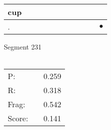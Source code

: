 \documentclass[landscape]{article}
\newcommand{\ssp}{\hspace{2pt}}
\newcommand{\mex}{\cellcolor{g}$\bullet$}
\begin{document}
\begin{tabular}{|l|p{10pt}|p{10pt}|p{10pt}|p{10pt}|p{10pt}|p{10pt}|p{10pt}|p{10pt}|p{10pt}|p{10pt}|}
\hline
\ssp cup \ssp&\hspace{2pt}&\hspace{2pt}&\hspace{2pt}&\hspace{2pt}&\hspace{2pt}&\hspace{2pt}&\hspace{2pt}&\hspace{2pt}&\hspace{2pt}&\hspace{2pt}\\
\hline
\ssp \cellcolor{ref9}. \ssp&\hspace{2pt}&\hspace{2pt}&\hspace{2pt}&\hspace{2pt}&\hspace{2pt}&\hspace{2pt}&\hspace{2pt}&\hspace{2pt}&\hspace{2pt}&\hspace{2pt}\mex\\
\hline
\end{tabular}

\vspace{6pt}
\noindent Segment 231\\\\
\noindent\begin{tabular}{lm{12pt}r}
\hline
P:&&0.259\\
R:&&0.318\\
Frag:&&0.542\\
Score:&&0.141\\
\end{tabular}

\newpage
\end{document}
